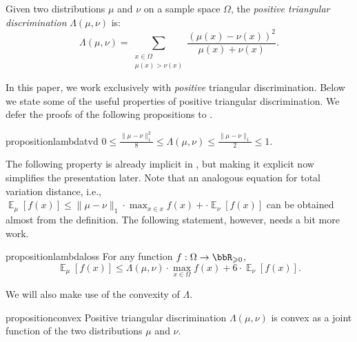 \documentclass[11pt,letterpaper]{article}
\DeclareMathOperator*{\E}{\mathbb{E}}
\renewcommand{\geq}{\geqslant}
\renewcommand{\leq}{\leqslant}
\renewcommand{\le}{\leq}
\renewcommand{\ge}{\geq}
\theoremstyle{definition}
\begin{document}
\begin{definition}
    Given two distributions $\mu$ and $\nu$ on a sample space $\Omega$, the \textit{positive triangular discrimination} 
    $\Lambda(\mu,\nu)$ is:
    \[
    \Lambda(\mu, \nu) = \sum_{\substack{x \in \Omega\\\mu(x) > \nu(x)}}\frac{(\mu(x) - \nu(x))^2}{\mu(x) + \nu(x)}.  %
    \]
\end{definition}

In this paper, we work exclusively with \textit{positive} triangular discrimination. Below we state some of the useful properties of positive triangular discrimination. We defer the proofs of the following propositions to .


\begin{restatable}{proposition}{lambdatvd}\label{prop:prop-lambda}
$0 \le \frac{\|\mu - \nu\|^2_1} 8\leq \Lambda(\mu, \nu)\leq \frac{\|\mu - \nu\|_1} 2 \le 1$. 
\end{restatable}


The following property is already implicit in \cite{Yehudayoff20}, but making it explicit now simplifies the presentation later. Note that an analogous equation for total variation distance, i.e., $\E_\mu[f(x)] \le \|\mu-\nu\|_1\cdot \max_{x \in x} f(x) + \cdot \E_{\nu}[f(x)]$ can be obtained almost from the definition. The following statement, however, needs a bit more work.

\begin{restatable}{proposition}{lambdaloss}\label{itm:lambda-loss}
For any function $f:\Omega\to\bbR_{\ge 0}$,
\[ \E_\mu[f(x)] \le \Lambda(\mu,\nu)\cdot \max_{x \in \Omega} f(x) + 6 \cdot \E_{\nu}[f(x)]. \]
\end{restatable}



\noindent
We will also make use of the convexity of $\Lambda$.

\begin{restatable}{proposition}{convex}\label{prop:convex}
Positive triangular discrimination $\Lambda(\mu,\nu)$ is convex as a joint function of the two distributions $\mu$ and $\nu$. 
\end{restatable}
\end{document}
